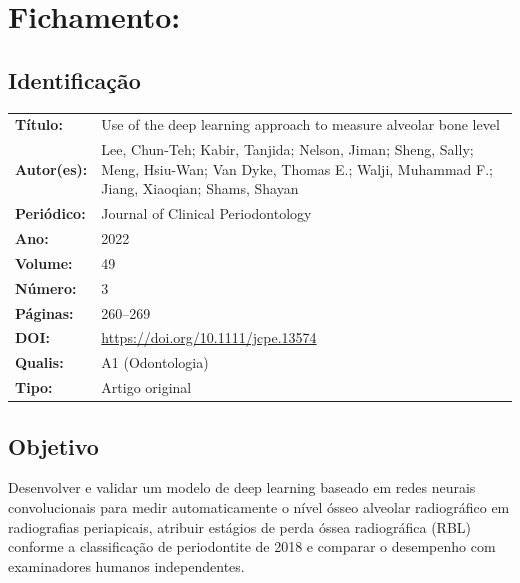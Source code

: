\section{Fichamento: }

\subsection{Identificação}
\begin{tabular}{ll}
\textbf{Título:} & Use of the deep learning approach to measure alveolar bone
level \\
\textbf{Autor(es):} & Lee, Chun-Teh; Kabir, Tanjida; Nelson, Jiman; Sheng, Sally;
Meng, Hsiu-Wan; Van Dyke, Thomas E.; Walji, Muhammad F.; Jiang, Xiaoqian;
Shams, Shayan \\
\textbf{Periódico:} & Journal of Clinical Periodontology \\
\textbf{Ano:} & 2022 \\
\textbf{Volume:} & 49 \\
\textbf{Número:} & 3 \\
\textbf{Páginas:} & 260--269 \\
\textbf{DOI:} & \url{https://doi.org/10.1111/jcpe.13574} \\
\textbf{Qualis:} & A1 (Odontologia) \\
\textbf{Tipo:} & Artigo original \\
\end{tabular}

\subsection{Objetivo}
Desenvolver e validar um modelo de deep learning baseado em redes neurais
convolucionais para medir automaticamente o nível ósseo alveolar radiográfico
em radiografias periapicais, atribuir estágios de perda óssea radiográfica
(RBL) conforme a classificação de periodontite de 2018 e comparar o desempenho
com examinadores humanos independentes.


